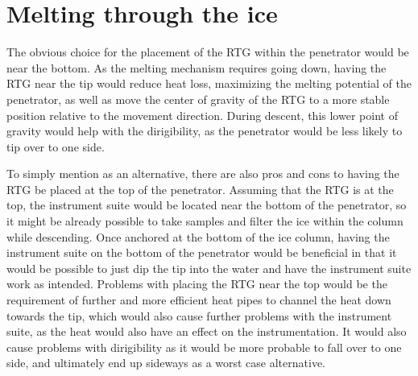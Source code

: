 \section{Melting through the ice} %

The obvious choice for the placement of the RTG within the penetrator would be near the bottom. As the melting mechanism requires going down, having the RTG near the tip would reduce heat loss, maximizing the melting potential of the penetrator, as well as move the center of gravity of the RTG to a more stable position relative to the movement direction. During descent, this lower point of gravity would help with the dirigibility, as the penetrator would be less likely to tip over to one side.

To simply mention as an alternative, there are also pros and cons to having the RTG be placed at the top of the penetrator. Assuming that the RTG is at the top, the instrument suite would be located near the bottom of the penetrator, so it might be already possible to take samples and filter the ice within the column while descending. Once anchored at the bottom of the ice column, having the instrument suite on the bottom of the penetrator would be beneficial in that it would be possible to just dip the tip into the water and have the instrument suite work as intended. Problems with placing the RTG near the top would be the requirement of further and more efficient heat pipes to channel the heat down towards the tip, which would also cause further problems with the instrument suite, as the heat would also have an effect on the instrumentation. It would also cause problems with dirigibility as it would be more probable to fall over to one side, and ultimately end up sideways as a worst case alternative. 

